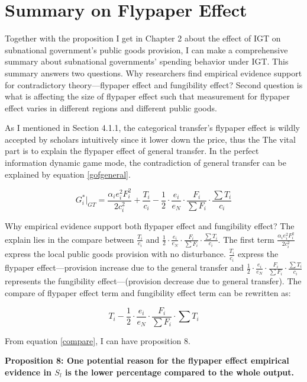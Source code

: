 \section{Summary on Flypaper Effect}

Together with the proposition I get in Chapter 2 about the effect of IGT on subnational government's public goods provision, I can make a comprehensive summary about subnational governments' spending behavior under IGT. This summary answers two questions. Why researchers find empirical evidence support for contradictory theory---flypaper effect and fungibility effect? Second question is what is affecting the size of flypaper effect such that measurement for flypaper effect varies in different regions and different public goods.

As I mentioned in Section 4.1.1, the categorical transfer's flypaper effect is wildly accepted by scholars intuitively since it lower down the price, thus the The vital part is to explain the flypaper effect of general transfer. In the perfect information dynamic game mode, the contradiction of general transfer can be explained by equation \ref*{gofgeneral}.

$$G_i^*|_{GT}=\frac{\alpha_i e_i^2F_i^2}{2c_i^2}+\frac{T_i}{c_i}-\frac{1}{2}\cdot \frac{e_i}{e_N}\cdot \frac{F_i}{\sum F_i} \cdot \frac{\sum T_i}{c_i}$$

Why empirical evidence support both flypaper effect and fungibility effect? The explain lies in the compare between $\frac{T_i}{c_i}$ and $\frac{1}{2}\cdot \frac{e_i}{e_N}\cdot \frac{F_i}{\sum F_i} \cdot \frac{\sum T_i}{c_i}$. The first term $\frac{\alpha_i e_i^2F_i^2}{2c_i^2}$ express the local public goods provision with no disturbance. $\frac{T_i}{c_i}$ express the flypaper effect---provision increase due to the general transfer and $\frac{1}{2}\cdot \frac{e_i}{e_N}\cdot \frac{F_i}{\sum F_i} \cdot \frac{\sum T_i}{c_i}$ represents the fungibility effect---(provision decrease due to general transfer). The compare of flypaper effect term and fungibility effect term can be rewritten as:

\begin{equation}\label{compare}
    T_i-\frac{1}{2}\cdot \frac{e_i}{e_N}\cdot \frac{F_i}{\sum F_i} \cdot \sum T_i
\end{equation}

From equation \ref*{compare}, I can have proposition 8.

\textbf{Proposition 8: One potential reason for the flypaper effect empirical evidence in $S_l$ is the lower percentage compared to the whole output.}

